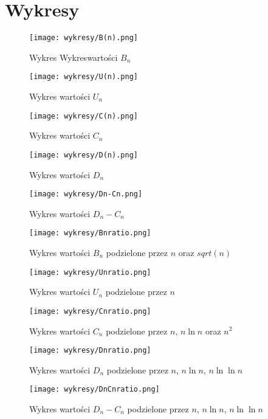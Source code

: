 \documentclass{article}
\begin{document}
\section{Wykresy}
\begin{figure}[ht]
    \centering
    \texttt{[image: wykresy/B(n).png]}
    \caption{Wykres Wykreswartości $B_n$}
    \label{fig:WykresBn}
\end{figure}
\begin{figure}[ht]
    \centering
    \texttt{[image: wykresy/U(n).png]}
    \caption{Wykres wartości $U_n$}
    \label{fig:WykresUn}
\end{figure}
\begin{figure}[ht]
    \centering
    \texttt{[image: wykresy/C(n).png]}
    \caption{Wykres wartości $C_n$}
    \label{fig:wykresCn}
\end{figure}
\begin{figure}[ht]
    \centering
    \texttt{[image: wykresy/D(n).png]}
    \caption{Wykres wartości $D_n$}
    \label{fig:WykresDn}
\end{figure}
\begin{figure}[ht]
    \centering
    \texttt{[image: wykresy/Dn-Cn.png]}
    \caption{Wykres wartości $D_n - C_n$}
    \label{fig:WykresDnCn}
\end{figure}
\begin{figure}[ht]
    \centering
    \texttt{[image: wykresy/Bnratio.png]}
    \caption{Wykres wartości $B_n$ podzielone przez $n$ oraz $sqrt(n)$}
    \label{fig:WykresBnratio}
\end{figure}
\begin{figure}[ht]
    \centering
    \texttt{[image: wykresy/Unratio.png]}
    \caption{Wykres wartości $U_n$ podzielone przez $n$}
    \label{fig:WykresUnratio}
\end{figure}
\begin{figure}[ht]
    \centering
    \texttt{[image: wykresy/Cnratio.png]}
    \caption{Wykres wartości $C_n$ podzielone przez $n$, $n \ln n$ oraz $n^2$}
    \label{fig:WykresCnratio}
\end{figure}
\begin{figure}[ht]
    \centering
    \texttt{[image: wykresy/Dnratio.png]}
    \caption{Wykres wartości $D_n$ podzielone przez $n$, $n \ln n$, $n \ln \ln n$}
    \label{fig:WykresDnratio}
\end{figure}
\begin{figure}[ht]
    \centering
    \texttt{[image: wykresy/DnCnratio.png]}
    \caption{Wykres wartości $D_n - C_n$ podzielone przez $n$, $n \ln n$, $n \ln \ln n$}
    \label{fig:WykresDn-Cn}
\end{figure}
\end{document}
